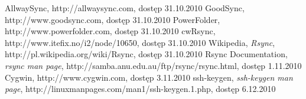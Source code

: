 \begin{thebibliography}{5}
   AllwaySync, http://allwaysync.com, dostęp 31.10.2010
   GoodSync, http://www.goodsync.com, dostęp 31.10.2010
   PowerFolder, http://www.powerfolder.com, dostęp 31.10.2010
   cwRsync, http://www.itefix.no/i2/node/10650, dostęp 31.10.2010
   Wikipedia, \textit{Rsync}, http://pl.wikipedia.org/wiki/Rsync, dostęp 31.10.2010
   Rsync Documentation, \textit{rsync man page}, http://samba.anu.edu.au/ftp/rsync/rsync.html, dostęp 1.11.2010
   Cygwin, http://www.cygwin.com, dostęp 3.11.2010
   ssh-keygen, \textit{ssh-keygen man page}, http://linuxmanpages.com/man1/ssh-keygen.1.php, dostęp 6.12.2010

\end{thebibliography} 
